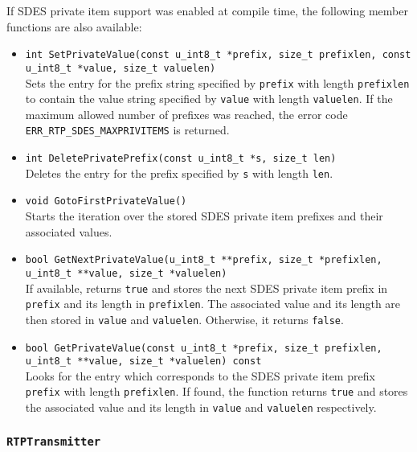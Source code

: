 \documentclass[12pt,a4paper]{article}
\newcommand{\headerfile}[1]{\marginpar{\scriptsize Header:\\{\tt #1}}}
\begin{document}
				If SDES private item support was enabled at compile time, the following
				member functions are also available:
				\begin{itemize}
					\item {\tt int SetPrivateValue(const u\_int8\_t *prefix, size\_t prefixlen, const u\_int8\_t *value, size\_t valuelen)}\\
						Sets the entry for the prefix string specified by {\tt prefix} with
						length {\tt prefixlen} to contain the value string specified by
						{\tt value} with length {\tt valuelen}. If the maximum allowed
						number of prefixes was reached, the error code
						{\tt ERR\_\-RTP\_\-SDES\_\-MAX\-PRIV\-ITEMS} is returned.
					\item {\tt int DeletePrivatePrefix(const u\_int8\_t *s, size\_t len)}\\
						Deletes the entry for the prefix specified by {\tt s} with length
						{\tt len}.
					\item {\tt void GotoFirstPrivateValue()}\\
						Starts the iteration over the stored SDES private item prefixes
						and their associated values.
					\item {\tt bool GetNextPrivateValue(u\_int8\_t **prefix, size\_t *prefixlen, u\_int8\_t **value, size\_t *valuelen)}\\
						If available, returns {\tt true} and stores the next SDES
						private item prefix in {\tt prefix} and its length in
						{\tt prefixlen}. The associated value and its length are
						then stored in {\tt value} and {\tt valuelen}. Otherwise,
						it returns {\tt false}.
					\item {\tt bool GetPrivateValue(const u\_int8\_t *prefix, size\_t prefixlen, u\_int8\_t **value, size\_t *valuelen) const}\\ 
						Looks for the entry which corresponds to the SDES private
						item prefix {\tt prefix} with length {\tt prefixlen}. If found,
						the function returns {\tt true} and stores the associated
						value and its length in {\tt value} and {\tt valuelen}
						respectively.
					\end{itemize}

            \subsubsection{\tt RTPTransmitter}\headerfile{rtptransmitter.h}
\end{document}
